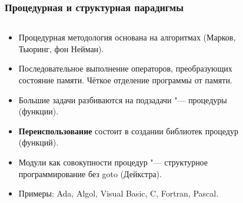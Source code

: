 \documentclass[default]{beamer}
\begin{document}
	\begin{frame}
		\frametitle{Процедурная и структурная парадигмы}
		
		\begin{columns}
			\begin{column}{0.7\textwidth}
				\begin{itemize}
					\item Процедурная методология основана на алгоритмах (Марков, Тьюринг, фон Нейман).
					\item Последовательное выполнение операторов, преобразующих состояние памяти. Чёткое отделение программы от памяти.
					\item Большие задачи разбиваются на подзадачи "--- процедуры (функции).
					\item \textbf{Переиспользование} состоит в создании библиотек процедур (функций).
					\item Модули как совокупности процедур "--- структурное программирование без goto (Дейкстра).
					\item Примеры: Ada, Algol, Visual Basic, C, Fortran, Pascal.
				\end{itemize}				
			\end{column}
			\begin{column}{0.3\textwidth}
				\begin{figure}

\end{figure}
\end{column}
\end{columns}
\end{frame}
\end{document}
